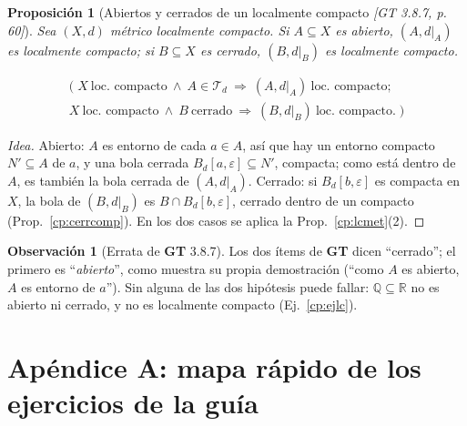 \documentclass[11pt,a4paper]{article}
\newcommand{\lgc}[1]{\par\vspace{-3pt}\begin{gather*}\big(\;#1\;\big)\end{gather*}\vspace{-6pt}}
\theoremstyle{definition}
\newtheorem{observacion}[definicion]{Observación}
\theoremstyle{plain}
\newtheorem{proposicion}[definicion]{Proposición}
\newcommand{\fnt}[1]{{\normalfont\small\itshape\color{gray!150!black}[#1]}}
\newcommand{\R}{\mathbb{R}}
\newcommand{\Q}{\mathbb{Q}}
\newcommand{\Bolac}[2]{B_d[#1,#2]}
\newcommand{\tp}{\mathcal{T}}
\begin{document}
\begin{proposicion}[Abiertos y cerrados de un localmente compacto \fnt{GT 3.8.7, p.\,60}]\label{cp:lcsub}
Sea $(X,d)$ métrico localmente compacto. Si $A\subseteq X$ es abierto, $(A,d|_A)$ es localmente compacto; si $B\subseteq X$ es cerrado, $(B,d|_B)$ es localmente compacto.
\lgc{X\ \text{loc. compacto}\ \wedge\ A\in\tp_d\ \Rightarrow\ (A,d|_A)\ \text{loc. compacto};\\ X\ \text{loc. compacto}\ \wedge\ B\ \text{cerrado}\ \Rightarrow\ (B,d|_B)\ \text{loc. compacto}.}
\end{proposicion}

\begin{proof}[Idea]
Abierto: $A$ es entorno de cada $a\in A$, así que hay un entorno compacto $N'\subseteq A$ de $a$, y una bola cerrada $\Bolac{a}{\varepsilon}\subseteq N'$, compacta; como está dentro de $A$, es también la bola cerrada de $(A,d|_A)$. Cerrado: si $\Bolac{b}{\varepsilon}$ es compacta en $X$, la bola de $(B,d|_B)$ es $B\cap\Bolac{b}{\varepsilon}$, cerrado dentro de un compacto (Prop.~\ref{cp:cerrcomp}). En los dos casos se aplica la Prop.~\ref{cp:lcmet}(2).
\end{proof}

\begin{observacion}[Errata de \textbf{GT} 3.8.7]
Los dos ítems de \textbf{GT} dicen ``cerrado''; el primero es ``\emph{abierto}'', como muestra su propia demostración (``como $A$ es abierto, $A$ es entorno de $a$''). Sin alguna de las dos hipótesis puede fallar: $\Q\subseteq\R$ no es abierto ni cerrado, y no es localmente compacto (Ej.~\ref{cp:ejlc}).
\end{observacion}


\clearpage
\section*{Apéndice A: mapa rápido de los ejercicios de la guía}
\end{document}
